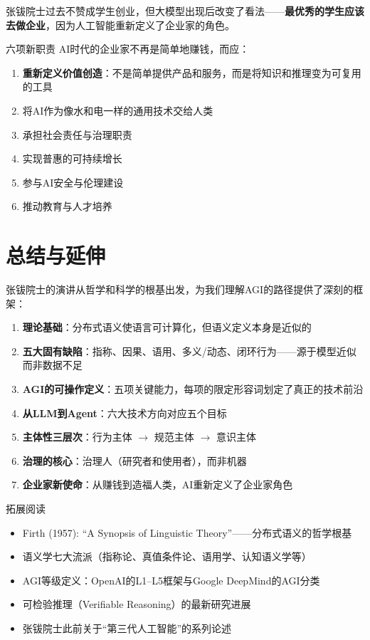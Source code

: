 \documentclass[a4paper]{article}
\begin{document}
张钹院士过去不赞成学生创业，但大模型出现后改变了看法——\textbf{最优秀的学生应该去做企业}，因为人工智能重新定义了企业家的角色。

\begin{importantbox}{六项新职责}
AI时代的企业家不再是简单地赚钱，而应：
\begin{enumerate}
\item \textbf{重新定义价值创造}：不是简单提供产品和服务，而是将知识和推理变为可复用的工具
\item 将AI作为像水和电一样的通用技术交给人类
\item 承担社会责任与治理职责
\item 实现普惠的可持续增长
\item 参与AI安全与伦理建设
\item 推动教育与人才培养
\end{enumerate}
\end{importantbox}


\section{总结与延伸}

张钹院士的演讲从哲学和科学的根基出发，为我们理解AGI的路径提供了深刻的框架：

\begin{enumerate}
\item \textbf{理论基础}：分布式语义使语言可计算化，但语义定义本身是近似的
\item \textbf{五大固有缺陷}：指称、因果、语用、多义/动态、闭环行为——源于模型近似而非数据不足
\item \textbf{AGI的可操作定义}：五项关键能力，每项的限定形容词划定了真正的技术前沿
\item \textbf{从LLM到Agent}：六大技术方向对应五个目标
\item \textbf{主体性三层次}：行为主体 $\rightarrow$ 规范主体 $\rightarrow$ 意识主体
\item \textbf{治理的核心}：治理人（研究者和使用者），而非机器
\item \textbf{企业家新使命}：从赚钱到造福人类，AI重新定义了企业家角色
\end{enumerate}

\begin{knowledgebox}{拓展阅读}
\begin{itemize}
\item Firth (1957): ``A Synopsis of Linguistic Theory''——分布式语义的哲学根基
\item 语义学七大流派（指称论、真值条件论、语用学、认知语义学等）
\item AGI等级定义：OpenAI的L1--L5框架与Google DeepMind的AGI分类
\item 可检验推理（Verifiable Reasoning）的最新研究进展
\item 张钹院士此前关于``第三代人工智能''的系列论述
\end{itemize}
\end{knowledgebox}

\end{document}
